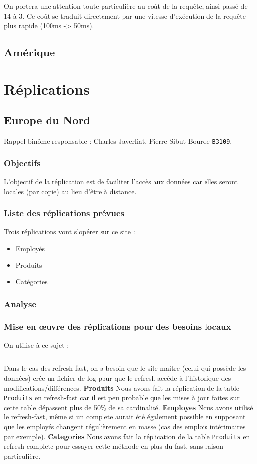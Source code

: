 \documentclass[10pt,a4paper]{article}
\theoremstyle{plain}
\begin{document}
On portera une attention toute particulière au coût de la requête, ainsi passé de 14 à 3. Ce coût se traduit directement par une vitesse d'exécution de la requête plus rapide (100ms -> 50ms).

\newpage

\subsection{Amérique}
\newpage

\section{Réplications}
\subsection{Europe du Nord}
Rappel binôme responsable : Charles Javerliat, Pierre Sibut-Bourde \verb|B3109|.
\subsubsection{Objectifs}
L’objectif de la réplication est de faciliter l’accès aux données car elles seront locales (par copie) au lieu d'être à distance.

\subsubsection{Liste des réplications prévues}
Trois réplications vont s'opérer sur ce site :
\begin{itemize}
    \item Employés
    \item Produits
    \item Catégories
\end{itemize}

\subsubsection{Analyse}

\subsubsection{Mise en \oe uvre des réplications pour des besoins locaux}
On utilise à ce sujet :
\inputminted{sql}{INSA-DB12-EuropeNord-replication.sql}
Dans le cas des refresh-fast, on a besoin que le site maitre (celui qui possède les données) crée un fichier de log pour que le refresh accède à l'historique des modifications/différences.
\hfill\break\hfill\break
\textbf{Produits}
Nous avons fait la réplication de la table \verb|Produits| en refresh-fast car il est peu probable que les mises à jour faites sur cette table dépassent plus de 50\% de sa cardinalité.
\hfill\break\hfill\break
\textbf{Employes}
Nous avons utilisé le refresh-fast, même si un complete aurait été également possible en supposant que les employés changent régulièrement en masse (cas des emplois intérimaires par exemple).
\hfill\break\hfill\break
\textbf{Categories}
Nous avons fait la réplication de la table \verb|Produits| en refresh-complete pour essayer cette méthode en plus du fast, sans raison particulière.
\hfill\break\hfill\break
\end{document}
